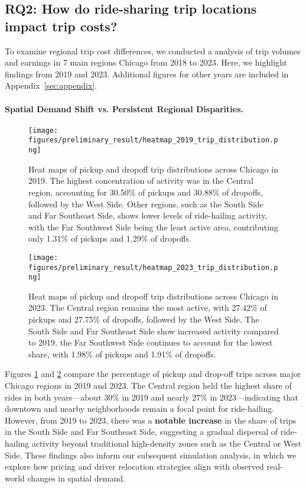 \subsection{RQ2: How do ride-sharing trip locations impact trip costs?}

To examine regional trip cost differences, we conducted a analysis of trip volumes and earnings in 7 main regions Chicago from 2018 to 2023. Here, we highlight findings from 2019 and 2023. Additional figures for other years are included in Appendix~\ref{sec:appendix}.


\paragraph{\textbf{Spatial Demand Shift vs. Persistent Regional Disparities.}}

\begin{figure}[ht!]
  \centering
  \texttt{[image: figures/preliminary\_result/heatmap\_2019\_trip\_distribution.png]}
\caption{Heat maps of pickup and dropoff trip distributions across Chicago in 2019. The highest concentration of activity was in the Central region, accounting for 30.50\% of pickups and 30.88\% of dropoffs, followed by the West Side. Other regions, such as the South Side and Far Southeast Side, shows lower levels of ride-hailing activity, with the Far Southwest Side being the least active area, contributing only 1.31\% of pickups and 1.29\% of dropoffs.}
    \label{fig:distribution_2019}
\end{figure}

\begin{figure}[H]
  \centering
  \texttt{[image: figures/preliminary\_result/heatmap\_2023\_trip\_distribution.png]}
\caption{Heat maps of pickup and dropoff trip distributions across Chicago in 2023. The Central region remains the most active, with 27.42\% of pickups and 27.75\% of dropoffs, followed by the West Side. The South Side and Far Southeast Side show increased activity compared to 2019, the Far Southwest Side continues to account for the lowest share, with 1.98\% of pickups and 1.91\% of dropoffs.}
    \label{fig:distribution_2023}
\end{figure}


Figures \ref{fig:distribution_2019} and \ref{fig:distribution_2023} compare the percentage of pickup and drop-off trips across major Chicago regions in 2019 and 2023. The Central region held the highest share of rides in both years---about 30\% in 2019 and nearly 27\% in 2023---indicating that downtown and nearby neighborhoods remain a focal point for ride-hailing. However, from 2019 to 2023, there was a \textbf{notable increase} in the share of trips in the South Side and Far Southeast Side, suggesting a gradual dispersal of ride-hailing activity beyond traditional high-density zones such as the Central or West Side. These findings also inform our subsequent simulation analysis, in which we explore how pricing and driver relocation strategies align with observed real-world changes in spatial demand.

